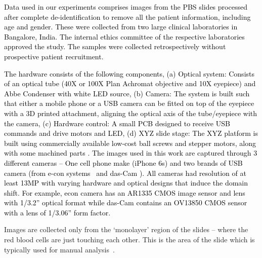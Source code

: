 \documentclass[journal,twoside,web]{IEEEtran}
\renewcommand{\textrightarrow}{}
\newcommand{\bb}{\textcolor{black}}
\begin{document}
\begin{figure*}
\centering
 \caption{\bb{t-SNE plots of features generated by ADDA~\cite{tzeng2017adversarial}, GTA~\cite{sankaranarayanan2018generate}, DIRT-T~\cite{shu2018dirt}, TAT~\cite{liu2019transferable}, DAL~\cite{peng2019domain} and TIGDA on domain adaptation task A\textrightarrow C. We used different markers and different colors to denote 11 categories. It is seen that TIGDA offers better clustering as compared to the rest.}}
\label{fig:tsne}
\end{figure*}\bb{Data used in our experiments comprises images from the PBS slides processed after complete de-identification to remove all the patient information, including age and gender. These were collected from two large clinical laboratories in Bangalore, India. The internal ethics committee of the respective laboratories approved the study. The samples were collected retrospectively 
without prospective patient recruitment.} \par\bb{The hardware consists of the following components,
(a) Optical system: Consists of an optical tube (40X or 100X Plan Achromat objective and 10X eyepiece) and Abbe Condenser with white LED source,
(b) Camera: The system is built such that either a mobile phone or a USB camera can be fitted on top of the eyepiece with a 3D printed attachment, aligning the optical axis of the tube/eyepiece with the camera,
(c) Hardware control: A small PCB designed to receive USB commands and drive motors and LED,
(d) XYZ slide stage: The XYZ platform is built using commercially available low-cost ball screws and stepper motors, along with some machined parts \cite{dastidar2020whole}.
The images used in this work are captured through 3 different cameras -- One cell phone make (iPhone 6s) and two brands of USB camera (from e-con systems~\cite{econ} and das-Cam \cite{dascam}). All cameras had resolution of at least 13MP with varying hardware and optical designs that induce the domain shift. For example, econ camera has an AR1335 CMOS image sensor and lens with 1/3.2'' optical format while das-Cam contains an OV13850 CMOS sensor with a lens of 1/3.06'' form factor.} \par Images are collected only from the `monolayer' region of the slides -- where the red blood cells are just touching each other. This is the area of the slide which is typically used for manual analysis~\cite{bloodbook}.
\end{document}
